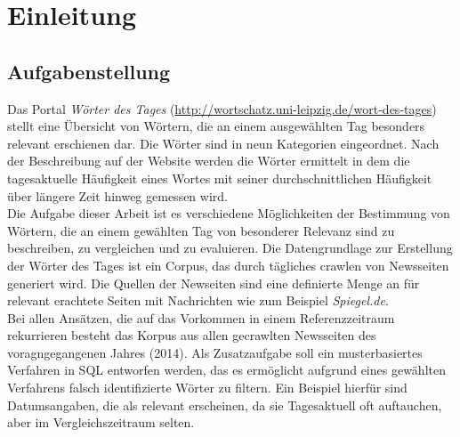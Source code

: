 


\ourtitlepage 
\tableofcontents
{} %
\clearpage
{} %



\chapter{Einleitung}

\section{Aufgabenstellung}
Das Portal  \emph{Wörter des Tages} (\url{http://wortschatz.uni-leipzig.de/wort-des-tages}) stellt eine Übersicht von Wörtern, die an einem ausgewählten Tag besonders relevant erschienen dar. Die Wörter sind in neun Kategorien eingeordnet. Nach der Beschreibung auf der Website werden die Wörter ermittelt in dem die tagesaktuelle Häufigkeit eines Wortes mit seiner durchschnittlichen Häufigkeit über längere Zeit hinweg gemessen wird.\\
Die Aufgabe dieser Arbeit ist es verschiedene Möglichkeiten der Bestimmung von Wörtern, die an einem gewählten Tag von besonderer Relevanz sind zu beschreiben, zu vergleichen und zu evaluieren. 
Die Datengrundlage zur Erstellung der Wörter des Tages ist ein Corpus, das durch tägliches crawlen von Newsseiten generiert wird. Die Quellen der Newseiten sind eine definierte Menge an für relevant erachtete Seiten mit Nachrichten wie zum Beispiel \emph{Spiegel.de}.\\
Bei allen Ansätzen, die auf das Vorkommen in einem Referenzzeitraum rekurrieren besteht das Korpus aus allen gecrawlten Newsseiten des voragngegangenen Jahres (2014).
Als Zusatzaufgabe soll ein musterbasiertes Verfahren in SQL entworfen werden, das es ermöglicht aufgrund eines gewählten Verfahrens falsch identifizierte Wörter zu filtern. Ein Beispiel hierfür sind Datumsangaben, die als relevant erscheinen, da sie Tagesaktuell oft auftauchen, aber im Vergleichszeitraum selten.

